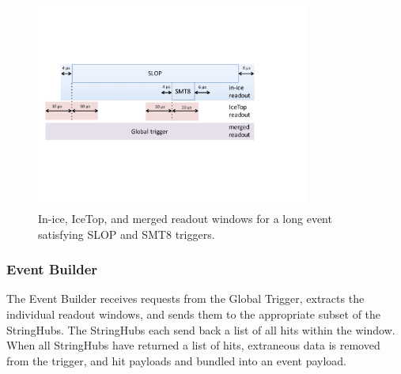 \begin{figure}[!ht]
 \centering
 \includegraphics[width=0.8\textwidth]{graphics/online/trigger/trigger_readout}
 \caption{In-ice, IceTop, and merged readout windows for a long event
   satisfying SLOP and SMT8 triggers.}
 \label{fig:trigger_readout}
\end{figure}


\subsubsection{\label{sect:online:evbuilder}Event Builder}

The Event Builder receives requests from the Global Trigger, extracts the
individual readout windows, and sends them to the appropriate subset of the
StringHubs.  The StringHubs each send back a list of all hits within the
window.  When all StringHubs have returned a list of hits, extraneous data is
removed from the trigger, and hit payloads and bundled into an event payload.

